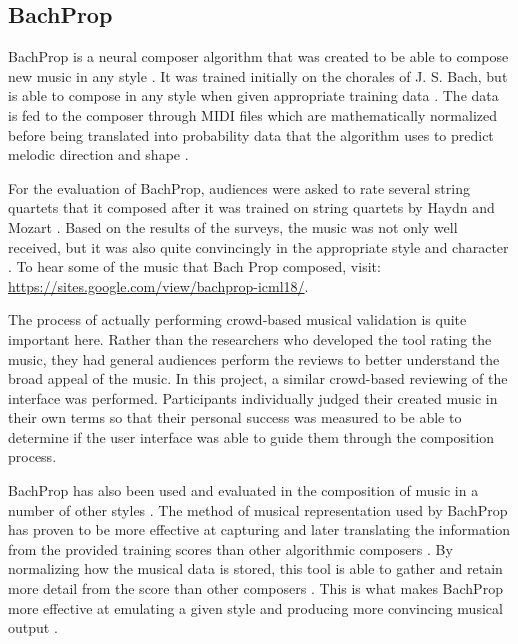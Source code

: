 \subsection{BachProp}
\label{subsec:bachprop}

BachProp is a neural composer algorithm that was created to be able to compose new music in any style \cite{Colombo_2018Com}.  It was trained initially on the chorales of J. S. Bach, but is able to compose in any style when given appropriate training data \cite{Colombo_2018Com}.  The data is fed to the composer through MIDI files which are mathematically normalized before being translated into probability data that the algorithm uses to predict melodic direction and shape \cite{Colombo_2018Com}.

\vspace{\baselineskip}

For the evaluation of BachProp, audiences were asked to rate several string quartets that it composed after it was trained on string quartets by Haydn and Mozart \cite{Colombo_2018Com}.  Based on the results of the surveys, the music was not only well received, but it was also quite convincingly in the appropriate style and character \cite{Colombo_2018Com}.  To hear some of the music that Bach Prop composed, visit: \url{https://sites.google.com/view/bachprop-icml18/}.

\vspace{\baselineskip}

The process of actually performing crowd-based musical validation is quite important here.  Rather than the researchers who developed the tool rating the music, they had general audiences perform the reviews to better understand the broad appeal of the music.  In this project, a similar crowd-based reviewing of the interface was performed.  Participants individually judged their created music in their own terms so that their personal success was measured to be able to determine if the user interface was able to guide them through the composition process.

\vspace{\baselineskip}

BachProp has also been used and evaluated in the composition of music in a number of other styles \cite{Colombo_2018Gen}.  The method of musical representation used by BachProp has proven to be more effective at capturing and later translating the information from the provided training scores than other algorithmic composers \cite{Colombo_2018Gen}.  By normalizing how the musical data is stored, this tool is able to gather and retain more detail from the score than other composers \cite{Colombo_2018Gen}.  This is what makes BachProp more effective at emulating a given style and producing more convincing musical output \cite{Colombo_2018Gen}.

